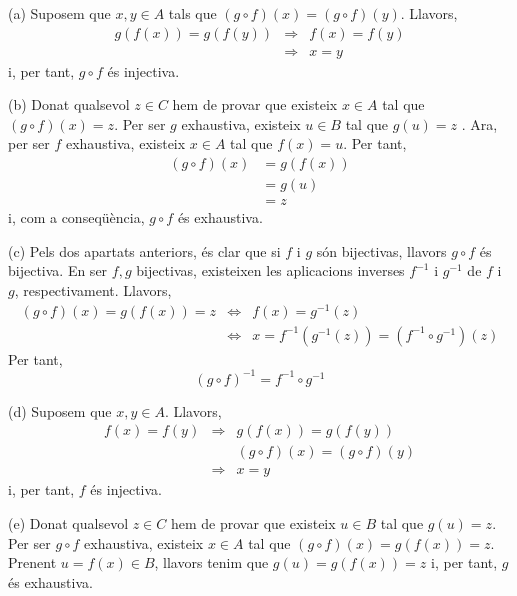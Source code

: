 \begin{solucio}
(a) Suposem que $x,y\in A$ tals que $(g\circ f)(x)=(g\circ f)(y)$. Llavors,%
\begin{equation*}
\begin{array}{lll}
g\left( f(x)\right) =g\left( f(y)\right) & \Longrightarrow & f(x)=f(y) \\
& \Longrightarrow & x=y%
\end{array}%
\end{equation*}%
i, per tant, $g\circ f$ \'{e}s injectiva.

(b) Donat qualsevol $z\in C$ hem de provar que existeix $x\in A$ tal que $%
(g\circ f)(x)=z$. Per ser $g$ exhaustiva, existeix $u\in B$ tal que $g(u)=z$%
. Ara, per ser $f$ exhaustiva, existeix $x\in A$ tal que $f(x)=u$. Per tant,%
\begin{align*}
(g\circ f)(x)& =g\left( f(x)\right) \\
& =g(u) \\
& =z
\end{align*}%
i, com a conseq\"{u}\`{e}ncia, $g\circ f$ \'{e}s exhaustiva.

(c) Pels dos apartats anteriors, \'{e}s clar que si $f$ i $g$ s\'{o}n
bijectivas, llavors $g\circ f$ \'{e}s bijectiva. En ser $f,g$ bijectivas,
existeixen les aplicacions inverses $f^{-1}$ i $g^{-1}$ de $f$ i $g$,
respectivament. Llavors,%
\begin{equation*}
\begin{array}{lll}
(g\circ f)(x)=g\left( f(x)\right) =z & \Longleftrightarrow & f(x)=g^{-1}(z)
\\
& \Longleftrightarrow & x=f^{-1}\left( g^{-1}(z)\right) =(f^{-1}\circ
g^{-1})(z)%
\end{array}%
\end{equation*}%
Per tant,
\begin{equation*}
(g\circ f)^{-1}=f^{-1}\circ g^{-1}
\end{equation*}

(d) Suposem que $x,y\in A$. Llavors,%
\begin{equation*}
\begin{array}{lll}
f(x)=f(y) & \Longrightarrow & g\left( f(x)\right) =g\left( f(y)\right) \\
&  & (g\circ f)(x)=(g\circ f)(y) \\
& \Longrightarrow & x=y%
\end{array}%
\end{equation*}%
i, per tant, $f$ \'{e}s injectiva.

(e) Donat qualsevol $z\in C$ hem de provar que existeix $u\in B$ tal que $%
g(u)=z$. Per ser $g\circ f$ exhaustiva, existeix $x\in A$ tal que $(g\circ
f)(x)=g\left( f(x)\right) =z$. Prenent $u=f(x)\in B$, llavors tenim que $%
g(u)=g\left( f(x)\right) =z$ i, per tant, $g$ \'{e}s exhaustiva.


\end{solucio}
